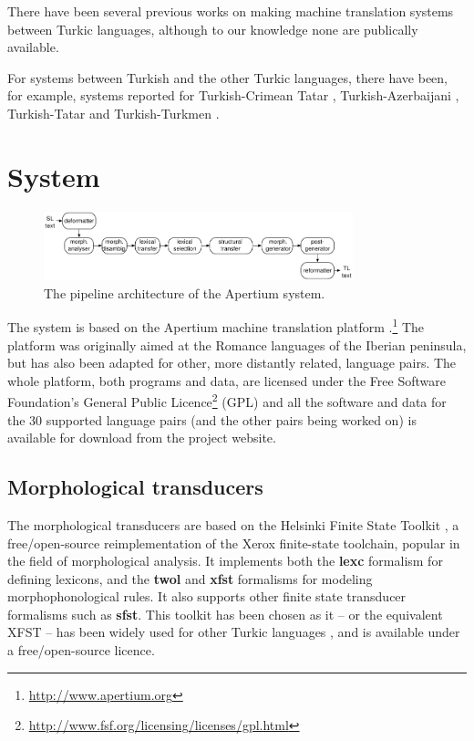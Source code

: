 \documentclass[11pt,a4paper]{article}
\begin{document}
There have been several previous works on making machine translation systems between 
Turkic languages, although to our knowledge none are publically available. 

For systems between Turkish and the other Turkic languages, there have been, 
for example, systems reported for Turkish-Crimean Tatar \cite{altintas01}, Turkish-Azerbaijani \cite{hamzaoglu93}, Turkish-Tatar \cite{suleymanov08} and Turkish-Turkmen \cite{tantug07}. 

\section{System}
\label{sec:sys}

\begin{figure}
\begin{center}
 \includegraphics[width=0.8\textwidth]{architecture.pdf}
\end{center}

\label{fig:modules}
\caption{The pipeline architecture of the Apertium system.}
\end{figure}

The system is based on the Apertium machine translation 
platform \cite{apertium/2011}.\footnote{\url{http://www.apertium.org}} The 
platform was originally aimed at the Romance languages of the Iberian peninsula, but has also been adapted for 
other, more distantly related, language pairs.
The whole platform, both programs and data, are licensed under the Free Software Foundation's General Public 
Licence\footnote{\url{http://www.fsf.org/licensing/licenses/gpl.html}} (GPL) and all the software and data for the 
30 supported language pairs (and the other pairs being worked on) is available for download from the project 
website.

\subsection{Morphological transducers}

The morphological transducers are based on the Helsinki Finite State Toolkit \cite{hfst/2011}, a free/open-source reimplementation of the Xerox finite-state toolchain, popular in the field of morphological analysis. It implements both the \textbf{lexc} formalism for defining lexicons, and the \textbf{twol} and \textbf{xfst} formalisms for modeling morphophonological rules. It also supports other finite state transducer formalisms such as \textbf{sfst}. This toolkit has been chosen as it -- or the equivalent XFST -- has been widely used for other Turkic languages \cite{coltekin2010,altintas2001,tantug2006}, and is available under a free/open-source licence.
\end{document}
